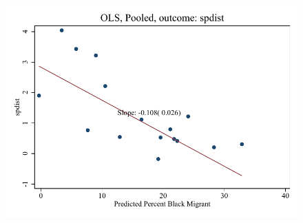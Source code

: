 \documentclass{article}
\begin{document}
\clearpage
\begin{figure}
	\centering
	\includegraphics[width=.8\textwidth]{figures/binscatter/pooled_spdist_ols_percent.pdf}
\end{figure}
\clearpage
\end{document}
